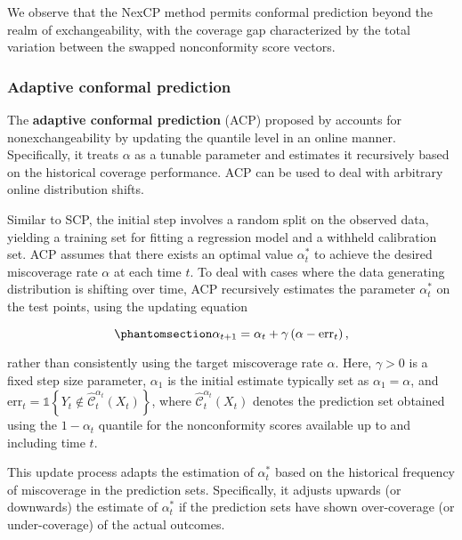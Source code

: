 \documentclass[
  11pt,
  a4paper,
]{article}
\theoremstyle{plain}
\theoremstyle{plain}
\theoremstyle{remark}
\begin{document}
We observe that the NexCP method permits conformal prediction beyond the
realm of exchangeability, with the coverage gap characterized by the
total variation between the swapped nonconformity score vectors.

\subsubsection{Adaptive conformal
prediction}\label{adaptive-conformal-prediction}

The \textbf{adaptive conformal prediction} (ACP) proposed by
\textcite{gibbs2021} accounts for nonexchangeability by updating the
quantile level in an online manner. Specifically, it treats \(\alpha\)
as a tunable parameter and estimates it recursively based on the
historical coverage performance. ACP can be used to deal with arbitrary
online distribution shifts.

Similar to SCP, the initial step involves a random split on the observed
data, yielding a training set for fitting a regression model and a
withheld calibration set. ACP assumes that there exists an optimal value
\(\alpha_{t}^{*}\) to achieve the desired miscoverage rate \(\alpha\) at
each time \(t\). To deal with cases where the data generating
distribution is shifting over time, ACP recursively estimates the
parameter \(\alpha_t^{*}\) on the test points, using the updating
equation

\begin{equation}\phantomsection\label{eq-acp}{
\alpha_{t+1} = \alpha_{t} + \gamma\left(\alpha - \mathrm{err}_t\right),
}\end{equation}

rather than consistently using the target miscoverage rate \(\alpha\).
Here, \(\gamma > 0\) is a fixed step size parameter, \(\alpha_1\) is the
initial estimate typically set as \(\alpha_1=\alpha\), and
\(\mathrm{err}_t = \mathbb{1}\left\{Y_t \notin \hat{\mathcal{C}}_{t}^{\alpha_t}\left(X_t\right)\right\}\),
where \(\hat{\mathcal{C}}_{t}^{\alpha_t}\left(X_t\right)\) denotes the
prediction set obtained using the \(1-\alpha_{t}\) quantile for the
nonconformity scores available up to and including time \(t\).

This update process adapts the estimation of \(\alpha_{t}^{*}\) based on
the historical frequency of miscoverage in the prediction sets.
Specifically, it adjusts upwards (or downwards) the estimate of
\(\alpha_{t}^{*}\) if the prediction sets have shown over-coverage (or
under-coverage) of the actual outcomes.
\end{document}
